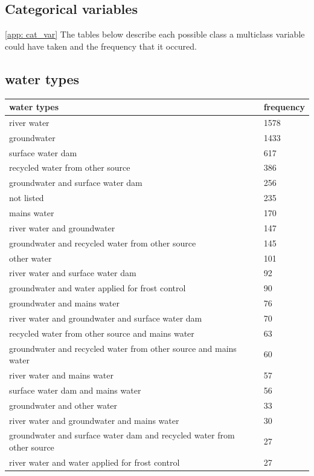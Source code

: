 \documentclass[review,12pt,authoryear]{elsarticle}
\begin{document}
\begin{linenumbers}
  \section{Categorical variables}\ref{app: cat_var}
  The tables below describe each possible class a multiclass variable could have taken and the frequency that it occured.
  \subsection{water types}
\begin{table}[]
  \begin{tabular}{@{}ll@{}}
  \toprule
  water types & frequency \\ \midrule
  river water & 1578 \\
  groundwater & 1433 \\
  surface water dam & 617 \\
  recycled water from other source & 386 \\
  groundwater and surface water dam & 256 \\
  not listed & 235 \\
  mains water & 170 \\
  river water and groundwater & 147 \\
  groundwater and recycled water from other source & 145 \\
  other water & 101 \\
  river water and surface water dam & 92 \\
  groundwater and water applied for frost control & 90 \\
  groundwater and mains water & 76 \\
  river water and groundwater and  surface water dam & 70 \\
  recycled water from other source and mains water & 63 \\
  groundwater and recycled water from other source and mains water & 60 \\
  river water and mains water & 57 \\
  surface water dam and mains water & 56 \\
  groundwater and other water & 33 \\
  river water and groundwater and mains water & 30 \\
  groundwater and surface water dam and recycled water from other source & 27 \\
  river water and water applied for frost control & 27 \\

\end{tabular}
\end{table}
\end{linenumbers}
\end{document}
